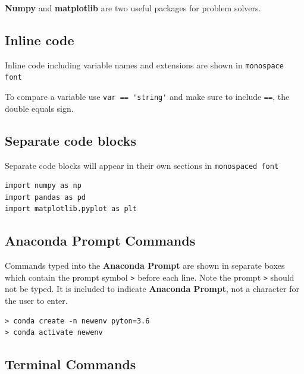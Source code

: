 \documentclass{book}
\begin{document}
\textbf{Numpy} and \textbf{matplotlib} are two useful packages for
problem solvers.
    




    
        \subsection{Inline code}\label{inline-code}

Inline code including variable names and extensions are shown in
\lstinline!monospace font!

To compare a variable use \lstinline!var == 'string'! and make sure to
include \lstinline!==!, the double equals sign.
    




    
        \subsection{Separate code blocks}\label{separate-code-blocks}

Separate code blocks will appear in their own sections in
\lstinline!monospaced font!

\begin{lstlisting}
import numpy as np
import pandas as pd
import matplotlib.pyplot as plt
\end{lstlisting}
    




    
        \subsection{Anaconda Prompt Commands}\label{anaconda-prompt-commands}

Commands typed into the \textbf{Anaconda Prompt} are shown in separate
boxes which contain the prompt symbol \lstinline!>! before each line.
Note the prompt \lstinline!>! should not be typed. It is included to
indicate \textbf{Anaconda Prompt}, not a character for the user to
enter.

\begin{lstlisting}
> conda create -n newenv pyton=3.6
> conda activate newenv
\end{lstlisting}
    




    
        \subsection{Terminal Commands}\label{terminal-commands}
\end{document}
